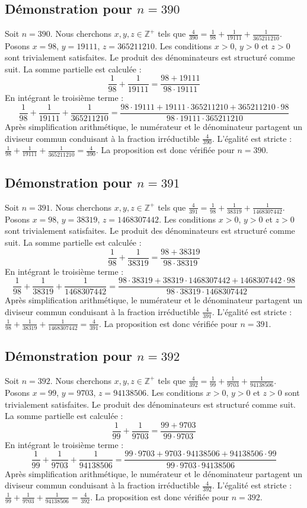 \documentclass[11pt,a4paper]{article}
\begin{document}
\subsection{Démonstration pour $n = 390$}
Soit $n = 390$. Nous cherchons $x, y, z \in \mathbb{Z}^{+}$ tels que $\frac{4}{390} = \frac{1}{98} + \frac{1}{19111} + \frac{1}{365211210}$.
Posons $x = 98$, $y = 19111$, $z = 365211210$.
Les conditions $x > 0$, $y > 0$ et $z > 0$ sont trivialement satisfaites.
Le produit des dénominateurs est structuré comme suit. La somme partielle est calculée :
$$ \frac{1}{98} + \frac{1}{19111} = \frac{98+19111}{98 \cdot 19111} $$
En intégrant le troisième terme :
$$ \frac{1}{98} + \frac{1}{19111} + \frac{1}{365211210} = \frac{98 \cdot 19111 + 19111 \cdot 365211210 + 365211210 \cdot 98}{98 \cdot 19111 \cdot 365211210} $$
Après simplification arithmétique, le numérateur et le dénominateur partagent un diviseur commun conduisant à la fraction irréductible $\frac{4}{390}$.
L'égalité est stricte : $\frac{1}{98} + \frac{1}{19111} + \frac{1}{365211210} = \frac{4}{390}$.
La proposition est donc vérifiée pour $n = 390$.
\subsection{Démonstration pour $n = 391$}
Soit $n = 391$. Nous cherchons $x, y, z \in \mathbb{Z}^{+}$ tels que $\frac{4}{391} = \frac{1}{98} + \frac{1}{38319} + \frac{1}{1468307442}$.
Posons $x = 98$, $y = 38319$, $z = 1468307442$.
Les conditions $x > 0$, $y > 0$ et $z > 0$ sont trivialement satisfaites.
Le produit des dénominateurs est structuré comme suit. La somme partielle est calculée :
$$ \frac{1}{98} + \frac{1}{38319} = \frac{98+38319}{98 \cdot 38319} $$
En intégrant le troisième terme :
$$ \frac{1}{98} + \frac{1}{38319} + \frac{1}{1468307442} = \frac{98 \cdot 38319 + 38319 \cdot 1468307442 + 1468307442 \cdot 98}{98 \cdot 38319 \cdot 1468307442} $$
Après simplification arithmétique, le numérateur et le dénominateur partagent un diviseur commun conduisant à la fraction irréductible $\frac{4}{391}$.
L'égalité est stricte : $\frac{1}{98} + \frac{1}{38319} + \frac{1}{1468307442} = \frac{4}{391}$.
La proposition est donc vérifiée pour $n = 391$.
\subsection{Démonstration pour $n = 392$}
Soit $n = 392$. Nous cherchons $x, y, z \in \mathbb{Z}^{+}$ tels que $\frac{4}{392} = \frac{1}{99} + \frac{1}{9703} + \frac{1}{94138506}$.
Posons $x = 99$, $y = 9703$, $z = 94138506$.
Les conditions $x > 0$, $y > 0$ et $z > 0$ sont trivialement satisfaites.
Le produit des dénominateurs est structuré comme suit. La somme partielle est calculée :
$$ \frac{1}{99} + \frac{1}{9703} = \frac{99+9703}{99 \cdot 9703} $$
En intégrant le troisième terme :
$$ \frac{1}{99} + \frac{1}{9703} + \frac{1}{94138506} = \frac{99 \cdot 9703 + 9703 \cdot 94138506 + 94138506 \cdot 99}{99 \cdot 9703 \cdot 94138506} $$
Après simplification arithmétique, le numérateur et le dénominateur partagent un diviseur commun conduisant à la fraction irréductible $\frac{4}{392}$.
L'égalité est stricte : $\frac{1}{99} + \frac{1}{9703} + \frac{1}{94138506} = \frac{4}{392}$.
La proposition est donc vérifiée pour $n = 392$.
\end{document}
